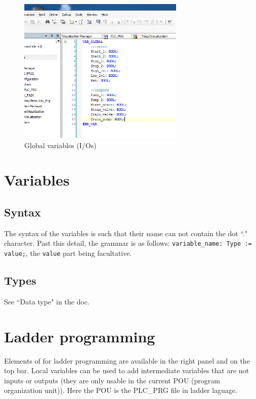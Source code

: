 \documentclass[10pt,a4paper]{article}
\begin{document}
\begin{figure}[h!]
	\begin{center}
		\includegraphics[width=300px]{img6.PNG}
	\end{center}
\caption{Global variables (I/Os)}
\label{fig:glob_var}
\end{figure}


\section{Variables}

\subsection{Syntax}
The syntax of the variables is such that their name can not contain the dot ``." character.
Past this detail, the grammar is as follows: \texttt{variable\_name: Type := value;}, the \texttt{value} part being facultative.

\subsection{Types}
See ``Data type" in the doc.


\section{Ladder programming}

Elements of for ladder programming are available in the right panel and on the top bar.
Local variables can be used to add intermediate variables that are not inputs or outputs (they are only usable in the current POU (program organization unit)). Here the POU is the PLC\_PRG file in ladder laguage.
\end{document}
